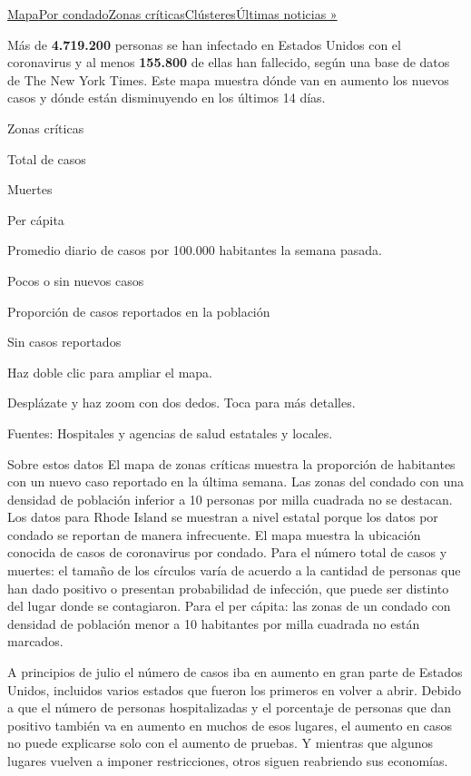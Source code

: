 \protect\hyperlink{map}{Mapa}\protect\hyperlink{states}{Por
condado}\protect\hyperlink{hotspots}{Zonas
críticas}\protect\hyperlink{clusters}{Clústeres}\href{https://www.nytimes.com/2020/08/03/world/coronavirus-covid-19.html}{Últimas
noticias »}

Más de \textbf{4.719.200} personas se han infectado en Estados Unidos
con el coronavirus y al menos \textbf{155.800} de ellas han fallecido,
según una base de datos de The New York Times. Este mapa muestra dónde
van en aumento los nuevos casos y dónde están disminuyendo en los
últimos 14 días.

Zonas críticas

Total de casos

Muertes

Per cápita

Promedio diario de casos por 100.000 habitantes la semana pasada.

Pocos o sin nuevos casos

Proporción de casos reportados en la población

Sin casos reportados

Haz doble clic para ampliar el mapa.

Desplázate y haz zoom con dos dedos. Toca para más detalles.

Fuentes: Hospitales y agencias de salud estatales y locales.

Sobre estos datos El mapa de zonas críticas muestra la proporción de
habitantes con un nuevo caso reportado en la última semana. Las zonas
del condado con una densidad de población inferior a 10 personas por
milla cuadrada no se destacan. Los datos para Rhode Island se muestran a
nivel estatal porque los datos por condado se reportan de manera
infrecuente. El mapa muestra la ubicación conocida de casos de
coronavirus por condado. Para el número total de casos y muertes: el
tamaño de los círculos varía de acuerdo a la cantidad de personas que
han dado positivo o presentan probabilidad de infección, que puede ser
distinto del lugar donde se contagiaron. Para el per cápita: las zonas
de un condado con densidad de población menor a 10 habitantes por milla
cuadrada no están marcados.

A principios de julio el número de casos iba en aumento en gran parte de
Estados Unidos, incluidos varios estados que fueron los primeros en
volver a abrir. Debido a que el número de personas hospitalizadas y el
porcentaje de personas que dan positivo también va en aumento en muchos
de esos lugares, el aumento en casos no puede explicarse solo con el
aumento de pruebas. Y mientras que algunos lugares vuelven a imponer
restricciones, otros siguen reabriendo sus economías.

